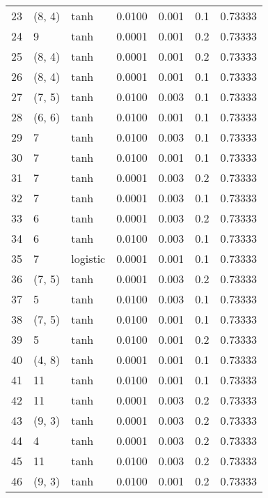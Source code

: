 \begin{tabular}{lllrrrr}
23  &      (8, 4) &      tanh &  0.0100 &  0.001 &  0.1 &   0.73333 \\
24  &           9 &      tanh &  0.0001 &  0.001 &  0.2 &   0.73333 \\
25  &      (8, 4) &      tanh &  0.0001 &  0.001 &  0.2 &   0.73333 \\
26  &      (8, 4) &      tanh &  0.0001 &  0.001 &  0.1 &   0.73333 \\
27  &      (7, 5) &      tanh &  0.0100 &  0.003 &  0.1 &   0.73333 \\
28  &      (6, 6) &      tanh &  0.0100 &  0.001 &  0.1 &   0.73333 \\
29  &           7 &      tanh &  0.0100 &  0.003 &  0.1 &   0.73333 \\
30  &           7 &      tanh &  0.0100 &  0.001 &  0.1 &   0.73333 \\
31  &           7 &      tanh &  0.0001 &  0.003 &  0.2 &   0.73333 \\
32  &           7 &      tanh &  0.0001 &  0.003 &  0.1 &   0.73333 \\
33  &           6 &      tanh &  0.0001 &  0.003 &  0.2 &   0.73333 \\
34  &           6 &      tanh &  0.0100 &  0.003 &  0.1 &   0.73333 \\
35  &           7 &  logistic &  0.0001 &  0.001 &  0.1 &   0.73333 \\
36  &      (7, 5) &      tanh &  0.0001 &  0.003 &  0.2 &   0.73333 \\
37  &           5 &      tanh &  0.0100 &  0.003 &  0.1 &   0.73333 \\
38  &      (7, 5) &      tanh &  0.0100 &  0.001 &  0.1 &   0.73333 \\
39  &           5 &      tanh &  0.0100 &  0.001 &  0.2 &   0.73333 \\
40  &      (4, 8) &      tanh &  0.0001 &  0.001 &  0.1 &   0.73333 \\
41  &          11 &      tanh &  0.0100 &  0.001 &  0.1 &   0.73333 \\
42  &          11 &      tanh &  0.0001 &  0.003 &  0.2 &   0.73333 \\
43  &      (9, 3) &      tanh &  0.0001 &  0.003 &  0.2 &   0.73333 \\
44  &           4 &      tanh &  0.0001 &  0.003 &  0.2 &   0.73333 \\
45  &          11 &      tanh &  0.0100 &  0.003 &  0.2 &   0.73333 \\
46  &      (9, 3) &      tanh &  0.0100 &  0.001 &  0.2 &   0.73333 \\

\end{tabular}
